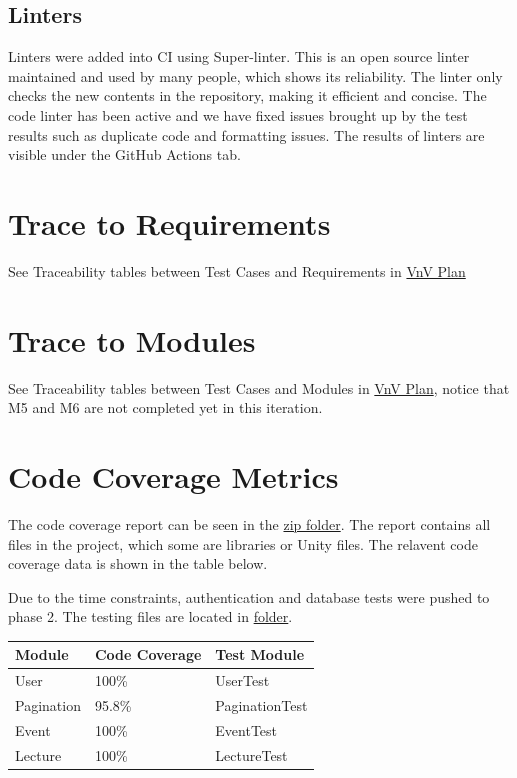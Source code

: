 \documentclass[12pt, titlepage]{article}
\begin{document}
\subsection{Linters}

Linters were added into CI using Super-linter. This is an open source linter maintained and used by many people, which shows its reliability.
The linter only checks the new contents in the repository, making it efficient and concise. 
The code linter has been active and we have fixed issues brought up by the test results such as duplicate code and formatting issues.
The results of linters are visible under the GitHub Actions tab.

\section{Trace to Requirements}
See Traceability tables between Test Cases and Requirements in \href{https://github.com/beatlepie/4G06CapstoneProjectTeam2/blob/main/docs/VnVPlan/VnVPlan.pdf}{VnV Plan}
\section{Trace to Modules}		
See Traceability tables between Test Cases and Modules in \href{https://github.com/beatlepie/4G06CapstoneProjectTeam2/blob/main/docs/VnVPlan/VnVPlan.pdf}{VnV Plan}, notice that M5 and M6 are not completed yet in this iteration.

\section{Code Coverage Metrics}
The code coverage report can be seen in the \href{https://github.com/beatlepie/4G06CapstoneProjectTeam2/blob/main/docs/VnVReport/Report.zip}{zip folder}.
The report contains all files in the project, which some are libraries or Unity files.
The relavent code coverage data is shown in the table below.

Due to the time constraints, authentication and database tests were pushed to phase 2.
The testing files are located in \href{https://github.com/beatlepie/4G06CapstoneProjectTeam2/tree/feat-testing-tests/src/CampusConnections/Assets/Editor}{folder}.

\begin{table}[h]
  \begin{tabular}{lll}
  \hline
  Module                   & Code Coverage & Test Module    \\
  \hline
  User                     & 100\%         & UserTest       \\
  Pagination               & 95.8\%        & PaginationTest \\
  Event                    & 100\%        & EventTest      \\
  Lecture                  & 100\%        & LectureTest    \\
  \hline
  \end{tabular}
  \end{table}
\end{document}
